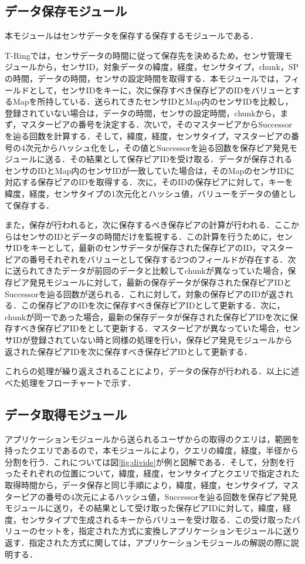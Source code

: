 \subsection{データ保存モジュール}
本モジュールはセンサデータを保存する保存するモジュールである．

T-Ringでは，センサデータの時間に従って保存先を決めるため，センサ管理モジュールから，センサID，対象データの緯度，経度，センサタイプ，chunk，SPの時間，データの時間，センサの設定時間を取得する．本モジュールでは，フィールドとして，センサIDをキーに，次に保存すべき保存ピアのIDをバリューとするMapを所持している．送られてきたセンサIDとMap内のセンサIDを比較し，登録されていない場合は，データの時間，センサの設定時間，chunkから，まず，マスターピアの番号を決定する．次いで，そのマスターピアからSuccessorを辿る回数を計算する．そして，緯度，経度，センサタイプ，マスターピアの番号の4次元からハッシュ化をし，その値とSuccessorを辿る回数を保存ピア発見モジュールに送る．その結果として保存ピアIDを受け取る．データが保存されるセンサのIDとMap内のセンサIDが一致していた場合は，そのMapのセンサIDに対応する保存ピアのIDを取得する．次に，そのIDの保存ピアに対して，キーを緯度，経度，センサタイプの1次元化とハッシュ値，バリューをデータの値として保存する．

また，保存が行われると，次に保存するべき保存ピアの計算が行われる．ここからはセンサのIDとデータの時間だけを監視する．この計算を行うために，センサIDをキーとして，最新のセンサデータが保存された保存ピアのID，マスターピアの番号それぞれをバリューとして保存する2つのフィールドが存在する．次に送られてきたデータが前回のデータと比較してchunkが異なっていた場合，保存ピア発見モジュールに対して，最新の保存データが保存された保存ピアIDとSuccessorを辿る回数が送られる．これに対して，対象の保存ピアのIDが返される．この保存ピアのIDを次に保存すべき保存ピアIDとして更新する．次に，chunkが同一であった場合，最新の保存データが保存された保存ピアIDを次に保存すべき保存ピアIDをとして更新する．マスターピアが異なっていた場合，センサIDが登録されていない時と同様の処理を行い，保存ピア発見モジュールから返された保存ピアIDを次に保存すべき保存ピアIDとして更新する．

これらの処理が繰り返えされることにより，データの保存が行われる．以上に述べた処理をフローチャートで示す．

\subsection{データ取得モジュール}
アプリケーションモジュールから送られるユーザからの取得のクエリは，範囲を持ったクエリであるので，本モジュールにより，クエリの緯度，経度，半径から分割を行う．これについては図\ref{fig:divide}が例と図解である．そして，分割を行ったそれぞれの位置について，緯度，経度，センサタイプとクエリで指定された取得時間から，データ保存と同じ手順により，緯度，経度，センサタイプ，マスターピアの番号の4次元によるハッシュ値，Successorを辿る回数を保存ピア発見モジュールに送り，その結果として受け取った保存ピアIDに対して，緯度，経度，センサタイプで生成されるキーからバリューを受け取る．この受け取ったバリューのセットを，指定された方式に変換しアプリケーションモジュールに送り返す．指定された方式に関しては，アプリケーションモジュールの解説の際に説明する．


